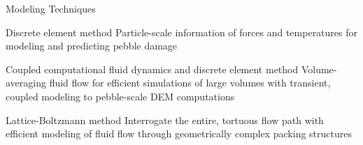 \begin{frame}{Modeling Techniques}
\begin{block}{Discrete element method}
Particle-scale information of forces and temperatures for modeling and predicting pebble damage
\end{block}
\begin{block}{Coupled computational fluid dynamics and discrete element method}
Volume-averaging fluid flow for efficient simulations of large volumes with transient, coupled modeling to pebble-scale DEM computations
\end{block}
\begin{block}{Lattice-Boltzmann method}
Interrogate the entire, tortuous flow path with efficient modeling of fluid flow through geometrically complex packing structures
\end{block}
\end{frame}